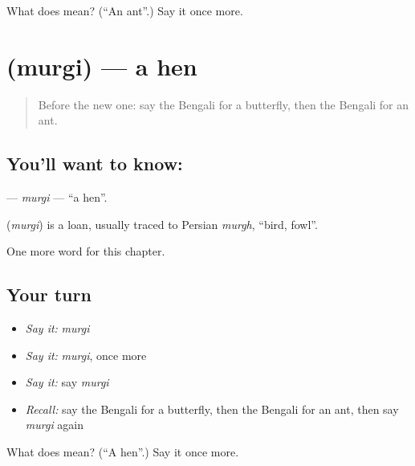 \begin{tcolorbox}[breakable,colback=teal!4,colframe=teal!35!black,title={Before you move on}]
What does  mean? (\textquotedblleft{}An ant\textquotedblright{}.) Say it once more.
\end{tcolorbox}
\section[\texorpdfstring{\bn{মুরগি} (murgi)}{মুরগি (murgi)}]{ (murgi) — a hen}

\label{lesson:BN-C71-murgi}



\begin{quote}
Before the new one: say the Bengali for a butterfly, then the Bengali for an ant.
\end{quote}

\subsection*{You'll want to know: }
\textbf{} — \emph{murgi} — \textquotedblleft{}a hen\textquotedblright{}.

\begin{cousinweb}
\textbf{} (\emph{murgi}) is a loan, usually traced to Persian \emph{murgh}, \textquotedblleft{}bird, fowl\textquotedblright{}.
\end{cousinweb}

\begin{grammarlens}[title={What you've built}]
One more word for this chapter.
\end{grammarlens}

\subsection*{Your turn}
\begin{itemize}
\raggedright
  \item \emph{Say it:} \emph{murgi}
  \item \emph{Say it:} \emph{murgi}, once more
  \item \emph{Say it:} say \emph{murgi}
  \item \emph{Recall:} say the Bengali for a butterfly, then the Bengali for an ant, then say \emph{murgi} again
\end{itemize}

\begin{tcolorbox}[breakable,colback=teal!4,colframe=teal!35!black,title={Before you move on}]
What does  mean? (\textquotedblleft{}A hen\textquotedblright{}.) Say it once more.
\end{tcolorbox}
